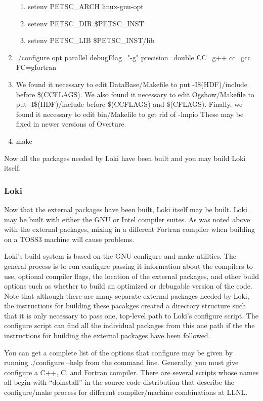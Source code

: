 \documentclass[11pt]{amsart}
\begin{document}
\begin{enumerate}
\begin{enumerate}
\item setenv PETSC\_ARCH linux-gnu-opt
\item setenv PETSC\_DIR \$PETSC\_INST
\item setenv PETSC\_LIB \$PETSC\_INST/lib
\end{enumerate}
\item ./configure opt parallel debugFlag="-g" precision=double CC=g++ cc=gcc \\
FC=gfortran
\item We found it necessary to edit DataBase/Makefile to put -I\$(HDF)/include
before \$(CCFLAGS).  We also found it necessary to edit Ogshow/Makefile to put
-I\$(HDF)/include before \$(CCFLAGS) and \$(CFLAGS).  Finally, we found it
necessary to edit bin/Makefile to get rid of -lmpio  These may be fixed in
newer versions of Overture.
\item make
\end{enumerate}

Now all the packages needed by Loki have been built and you may build Loki
itself.

\subsubsection*{Loki}
Now that the external packages have been built, Loki itself may be built.  Loki
may be built with either the GNU or Intel compiler suites.  As was noted above
with the external packages, mixing in a different Fortran compiler when
building on a TOSS3 machine will cause problems.

Loki's build system is based on the GNU configure and make utilities.  The
general process is to run configure passing it information about the compilers
to use, optional compiler flags, the location of the external packages, and
other build options such as whether to build an optimized or debugable version
of the code.  Note that although there are many separate external packages
needed by Loki, the instructions for building these pacakges created a
directory structure such that it is only necessary to pass one, top-level path
to Loki's configure script.  The configure script can find all the individual
packages from this one path if the the instructions for building the external
packages have been followed.

You can get a complete list of the options that configure may be given by
running ./configure --help from the command line.  Generally, you must give
configure a C++, C, and Fortran compiler.  There are several scripts whose
names all  begin with ``doinstall'' in the source code distribution that
describe the configure/make process for different compiler/machine combinations
at LLNL.
\end{document}
